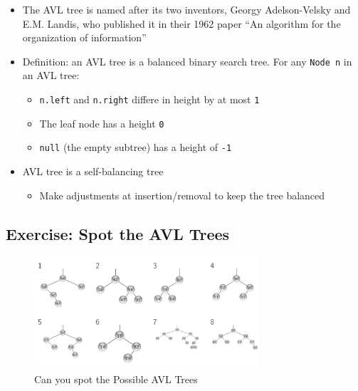 \documentclass[
  10pt,
  english,
  letterpaper,
,tablecaptionabove
]{scrartcl}
\newcommand{\passthrough}[1]{#1}
\providecommand{\tightlist}{%
  \setlength{\itemsep}{0pt}\setlength{\parskip}{0pt}}
\begin{document}
\begin{itemize}
\tightlist
\item
  The AVL tree is named after its two inventors, Georgy Adelson-Velsky
  and E.M. Landis, who published it in their 1962 paper \enquote{An
  algorithm for the organization of information}
\item
  Definition: an AVL tree is a balanced binary search tree. For any
  \passthrough{\lstinline!Node n!} in an AVL tree:

  \begin{itemize}
  \tightlist
  \item
    \passthrough{\lstinline!n.left!} and
    \passthrough{\lstinline!n.right!} differe in height by at most
    \passthrough{\lstinline!1!}
  \item
    The leaf node has a height \passthrough{\lstinline!0!}
  \item
    \passthrough{\lstinline!null!} (the empty subtree) has a height of
    \passthrough{\lstinline!-1!}
  \end{itemize}
\item
  AVL tree is a self-balancing tree

  \begin{itemize}
  \tightlist
  \item
    Make adjustments at insertion/removal to keep the tree balanced
  \end{itemize}
\end{itemize}

\hypertarget{exercise-spot-the-avl-trees}{%
\subsection{Exercise: Spot the AVL
Trees}\label{exercise-spot-the-avl-trees}}

\begin{figure}
\centering
\includegraphics[width=0.75\textwidth,height=\textheight]{images/2.png}
\caption{Can you spot the Possible AVL Trees}
\end{figure}
\end{document}
